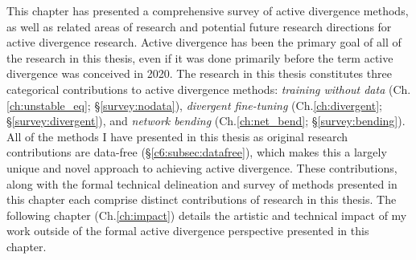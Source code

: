 This chapter has presented a comprehensive survey of active divergence methods, as well as related areas of research and potential future research directions for active divergence research. 
Active divergence has been the primary goal of all of the research in this thesis, even if it was done primarily before the term active divergence was conceived in 2020. 
The research in this thesis constitutes three categorical contributions to active divergence methods: \textit{training without data} (Ch.\ref{ch:unstable_eq}; \S \ref{survey:nodata}), \textit{divergent fine-tuning} (Ch.\ref{ch:divergent}; \S \ref{survey:divergent}), and \textit{network bending} (Ch.\ref{ch:net_bend}; \S \ref{survey:bending}). 
All of the methods I have presented in this thesis as original research contributions are data-free (\S \ref{c6:subsec:datafree}), which makes this a largely unique and novel approach to achieving active divergence. 
These contributions, along with the formal technical delineation and survey of methods presented in this chapter each comprise distinct contributions of research in this thesis.
The following chapter (Ch.\ref{ch:impact}) details the artistic and technical impact of my work outside of the formal active divergence perspective presented in this chapter. 
